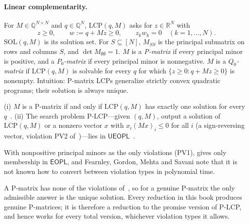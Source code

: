 \paragraph{Linear complementarity.} For $M\in\mathbb Q^{N\times N}$ and $q\in\mathbb Q^N$,
$\mathrm{LCP}(q,M)$ asks for $z\in\mathbb R^N$ with
\[
  z\ge0,\qquad w:=q+Mz\ge0,\qquad z_kw_k=0\quad(k=1,\dots,N).
\]
$\mathrm{SOL}(q,M)$ is its solution set. For $S\subseteq[N]$, $M_{SS}$ is the principal submatrix on
rows and columns $S$, and $\det M_{\emptyset\emptyset}=1$. $M$ is a \emph{P-matrix} if every principal
minor is positive, and a \emph{$P_0$-matrix} if every principal minor is nonnegative. $M$ is a
\emph{$Q_0$-matrix} if $\mathrm{LCP}(q,M)$ is solvable for every $q$ for which
$\{z\ge0:q+Mz\ge0\}$ is nonempty. Intuition: P-matrix LCPs generalize strictly convex quadratic
programs; their solution is always unique.

\begin{proposition}\label{prop:classical}
\statuscited
(i) $M$ is a P-matrix if and only if $\mathrm{LCP}(q,M)$ has exactly one solution for every
$q$~\cite{cps92}. (ii) The search problem P-LCP---given $(q,M)$, output a solution of
$\mathrm{LCP}(q,M)$ or a nonzero vector $x$ with $x_i(Mx)_i\le0$ for all $i$ (a sign-reversing vector,
violation PV2 of~\cite[Def.~36]{fgms18})---lies in $\mathsf{UEOPL}$~\cite[Thms.~39 and~81]{fgms18}.
\end{proposition}

With nonpositive principal minors as the only violations (PV1), \cite[Thm.~78]{fgms18} gives only
membership in $\mathsf{EOPL}$, and Fearnley, Gordon, Mehta and Savani note that it is not known how to
convert between violation types in polynomial time.

A P-matrix has none of the violations of~\cite[Def.~36]{fgms18}, so for a genuine P-matrix the only
admissible answer is the unique solution. Every reduction in this book produces genuine P-matrices; it is
therefore a reduction to the promise version of P-LCP, and hence works for every total version, whichever
violation types it allows.

